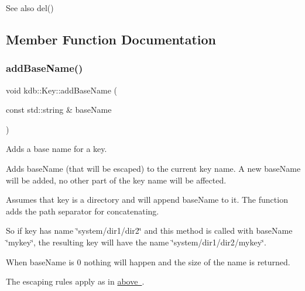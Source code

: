 \begin{DoxySeeAlso}{See also}
del() 
\end{DoxySeeAlso}


\subsection{Member Function Documentation}
\mbox{\label{classkdb_1_1Key_ad2f72ce0985413ce588dc33a575ea306}} 
\subsubsection{\texorpdfstring{addBaseName()}{addBaseName()}}
{\footnotesize\ttfamily void kdb\+::\+Key\+::add\+Base\+Name (\begin{DoxyParamCaption}\item[{const std\+::string \&}]{base\+Name }\end{DoxyParamCaption})\hspace{0.3cm}{\ttfamily [inline]}}



Adds a base name for a key. 

Adds {\ttfamily base\+Name} (that will be escaped) to the current key name. A new base\+Name will be added, no other part of the key name will be affected.

Assumes that {\ttfamily key} is a directory and will append {\ttfamily base\+Name} to it. The function adds the path separator for concatenating.

So if {\ttfamily key} has name {\ttfamily \char`\"{}system/dir1/dir2\char`\"{}} and this method is called with {\ttfamily base\+Name} {\ttfamily \char`\"{}mykey\char`\"{}}, the resulting key will have the name {\ttfamily \char`\"{}system/dir1/dir2/mykey\char`\"{}}.

When {\ttfamily base\+Name} is 0 nothing will happen and the size of the name is returned.

The escaping rules apply as in \mbox{\hyperlink{group__keyname}{above }}.

